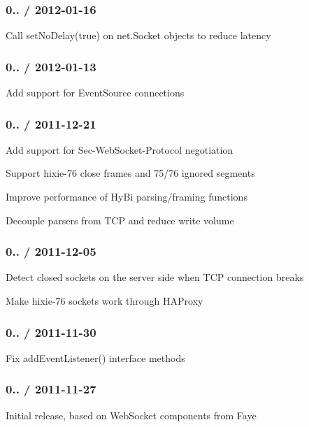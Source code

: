 \subsubsection*{0.. / 2012-\/01-\/16}


\begin{DoxyItemize}
\item Call {\ttfamily set\+No\+Delay(true)} on {\ttfamily net.\+Socket} objects to reduce latency
\end{DoxyItemize}

\subsubsection*{0.. / 2012-\/01-\/13}


\begin{DoxyItemize}
\item Add support for {\ttfamily Event\+Source} connections
\end{DoxyItemize}

\subsubsection*{0.. / 2011-\/12-\/21}


\begin{DoxyItemize}
\item Add support for {\ttfamily Sec-\/\+Web\+Socket-\/\+Protocol} negotiation
\item Support {\ttfamily hixie-\/76} close frames and 75/76 ignored segments
\item Improve performance of Hy\+Bi parsing/framing functions
\item Decouple parsers from T\+CP and reduce write volume
\end{DoxyItemize}

\subsubsection*{0.. / 2011-\/12-\/05}


\begin{DoxyItemize}
\item Detect closed sockets on the server side when T\+CP connection breaks
\item Make {\ttfamily hixie-\/76} sockets work through H\+A\+Proxy
\end{DoxyItemize}

\subsubsection*{0.. / 2011-\/11-\/30}


\begin{DoxyItemize}
\item Fix {\ttfamily add\+Event\+Listener()} interface methods
\end{DoxyItemize}

\subsubsection*{0.. / 2011-\/11-\/27}


\begin{DoxyItemize}
\item Initial release, based on Web\+Socket components from Faye 
\end{DoxyItemize}